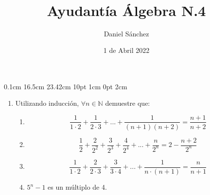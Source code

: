 \documentclass[12pt]{article}
\begin{document}
\setmargins{2.5cm}
{0.1cm}
{16.5cm}
{23.42cm}
{10pt}
{1cm}
{0pt}
{2cm}

\title{Ayudant\'ia \'Algebra N.4}
\date{1 de Abril 2022}
\author{Daniel S\'anchez}
\maketitle

\begin{enumerate}
      \item Utilizando inducci\'on, $\forall n \in \mathbb{N}$ demuestre que:
            \begin{enumerate}
                  \item 
                        $$\frac{1}{1 \cdot 2}+\frac{1}{2\cdot 3}+...+\frac{1}{(n+1)(n+2)}=\frac{n+1}{n+2}$$
                  \item 
                        $$\frac{1}{2}+\frac{2}{2^2}+\frac{3}{2^3}+\frac{4}{2^4}+...+\frac{n}{2^n}=2-\frac{n+2}{2^n}$$
                  \item 
                        $$\frac{1}{1\cdot 2}+\frac{2}{2\cdot 3}+\frac{3}{3\cdot 4}+...+\frac{1}{n\cdot (n+1)}=\frac{n}{n+1}$$
                  \item $5^{n}-1$ es un m\'ultiplo de 4.
            \end{enumerate}
\end{enumerate}
\end{document}
